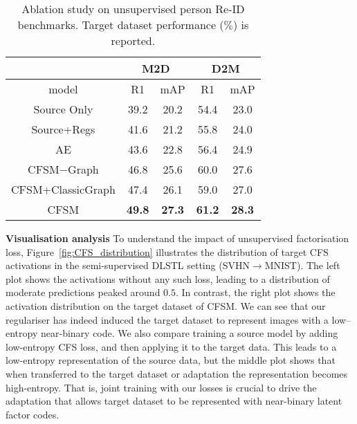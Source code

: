 \documentclass[letterpaper]{article} \usepackage{aaai19}  \usepackage{times}  \usepackage{helvet}  \usepackage{courier}  \usepackage{url}  \usepackage{graphicx}
\newcommand{\keypoint}[1]{\noindent\textbf{#1}\quad}
\begin{document}
\begin{table}[t]
\centering
\small
\begin{tabular}{c|cc|cc}
\hline
\multicolumn{1}{c|}{} & \multicolumn{2}{c|}{M2D} & \multicolumn{2}{c}{D2M} \\ \hline
model                 & R1          & mAP         & R1           & mAP         \\ \hline
Source Only              & 39.2       & 20.2        & 54.4         & 23.0        \\
Source+Regs            & 41.6       & 21.2        & 55.8         & 24.0        \\
AE                     & 43.6       & 22.8        & 56.4         & 24.9        \\ \hline
CFSM$-$Graph            & 46.8        & 25.6        & 60.0         & 27.6        \\ 
CFSM+ClassicGraph              & 47.4        & 26.1        & 59.0         & 27.0        \\ 
CFSM                    & {\bf 49.8}        & {\bf 27.3}        & {\bf 61.2}         & {\bf 28.3}        \\ \hline
\end{tabular}
\caption{Ablation study on unsupervised person Re-ID benchmarks. Target dataset performance ($\%$) is reported.}
\label{tab:reid_ablation}
\end{table}







\keypoint{Visualisation analysis} To understand the impact of unsupervised factorisation loss, Figure~\ref{fig:CFS_distribution} illustrates the distribution of target CFS activations in the semi-supervised DLSTL setting (SVHN$\to$MNIST). The left plot shows the activations without any such loss, leading to a distribution of moderate predictions peaked around $0.5$. In contrast, the right plot shows the activation distribution on the target dataset of CFSM. We can see that our regulariser has indeed induced the target dataset to represent images with a low--entropy near-binary code. We also compare training a source model by adding low-entropy CFS loss, and then applying it to the target data.
This leads to a low-entropy representation of the source data, but the middle plot shows that when transferred to the target dataset or adaptation the representation becomes high-entropy. That is, joint training with our losses is crucial to drive the adaptation that allows target dataset to be represented with near-binary latent factor codes.
 
\end{document}
